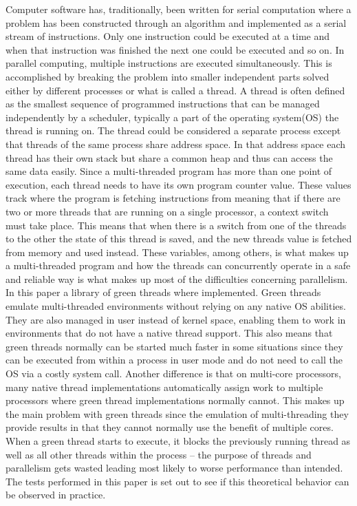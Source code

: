 \documentclass{article}
\begin{document}
Computer software has, traditionally, been written for serial computation where a problem has been constructed through an algorithm and implemented as a serial stream of instructions. Only one instruction could be executed at a time and when that instruction was finished the next one could be executed and so on. In parallel computing, multiple instructions are executed simultaneously. This is accomplished by breaking the problem into smaller independent parts solved either by different processes or what is called a thread.
A thread is often defined as the smallest sequence of programmed instructions that can be managed independently by a scheduler, typically a part of the operating system(OS) the thread is running on. The thread could be considered a separate process except that threads of the same process share address space. In that address space each thread has their own stack but share a common heap and thus can access the same data easily. Since a multi-threaded program has more than one point of execution, each thread needs to have its own program counter value. These values track where the program is fetching instructions from meaning that if there are two or more threads that are running on a single processor, a context switch must take place. This means that when there is a switch from one of the threads to the other the state of this thread is saved, and the new threads value is fetched from memory and used instead. These variables, among others, is what makes up a multi-threaded program and how the threads can concurrently operate in a safe and reliable way is what makes up most of the difficulties concerning parallelism.  
In this paper a library of green threads where implemented. Green threads emulate multi-threaded environments without relying on any native OS abilities. They are also managed in user instead of kernel space, enabling them to work in environments that do not have a native thread support. This also means that green threads normally can be started much faster in some situations since they can be executed from within a process in user mode and do not need to call the OS via a costly system call. Another difference is that on multi-core processors, many native thread implementations automatically assign work to multiple processors where green thread implementations normally cannot. This makes up the main problem with green threads since the emulation of multi-threading they provide results in that they cannot normally use the benefit of multiple cores. When a green thread starts to execute, it blocks the previously running thread  as well as all other threads within the process – the purpose of threads and parallelism gets wasted leading most likely to worse performance than intended. The tests performed in this paper is set out to see if this theoretical behavior can be observed in practice.
\end{document}
